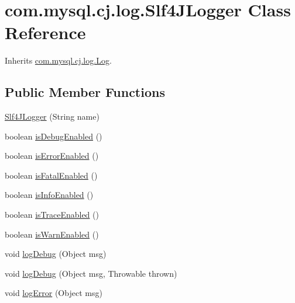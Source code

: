 \hypertarget{classcom_1_1mysql_1_1cj_1_1log_1_1_slf4_j_logger}{}\section{com.\+mysql.\+cj.\+log.\+Slf4\+J\+Logger Class Reference}
\label{classcom_1_1mysql_1_1cj_1_1log_1_1_slf4_j_logger}


Inherits \mbox{\hyperlink{interfacecom_1_1mysql_1_1cj_1_1log_1_1_log}{com.\+mysql.\+cj.\+log.\+Log}}.

\subsection*{Public Member Functions}
\begin{DoxyCompactItemize}
\item 
\mbox{\hyperlink{classcom_1_1mysql_1_1cj_1_1log_1_1_slf4_j_logger_af5581eba75f230b5acbb76789e679593}{Slf4\+J\+Logger}} (String name)
\item 
boolean \mbox{\hyperlink{classcom_1_1mysql_1_1cj_1_1log_1_1_slf4_j_logger_a2063aafb5440a0a1a8b9038603916773}{is\+Debug\+Enabled}} ()
\item 
boolean \mbox{\hyperlink{classcom_1_1mysql_1_1cj_1_1log_1_1_slf4_j_logger_a3401a68eb92f0e0eec87e8140c36faa7}{is\+Error\+Enabled}} ()
\item 
boolean \mbox{\hyperlink{classcom_1_1mysql_1_1cj_1_1log_1_1_slf4_j_logger_ae5ee0af225f5bc993dc023b8b31de983}{is\+Fatal\+Enabled}} ()
\item 
boolean \mbox{\hyperlink{classcom_1_1mysql_1_1cj_1_1log_1_1_slf4_j_logger_ab21b243a10ab8a46a4706658298ecd5e}{is\+Info\+Enabled}} ()
\item 
boolean \mbox{\hyperlink{classcom_1_1mysql_1_1cj_1_1log_1_1_slf4_j_logger_afbf9106392050f7ca64b0ad7582b7517}{is\+Trace\+Enabled}} ()
\item 
boolean \mbox{\hyperlink{classcom_1_1mysql_1_1cj_1_1log_1_1_slf4_j_logger_aaf12f87af0d37c01118649ba65220a69}{is\+Warn\+Enabled}} ()
\item 
void \mbox{\hyperlink{classcom_1_1mysql_1_1cj_1_1log_1_1_slf4_j_logger_aef79b4ff2ba3058fe4f713db62707e6c}{log\+Debug}} (Object msg)
\item 
void \mbox{\hyperlink{classcom_1_1mysql_1_1cj_1_1log_1_1_slf4_j_logger_aeaf3ce8432b63f1b631e7ad698ea7aa6}{log\+Debug}} (Object msg, Throwable thrown)
\item 
void \mbox{\hyperlink{classcom_1_1mysql_1_1cj_1_1log_1_1_slf4_j_logger_a1a99e9a4f586e0678a68d1145cd26bc5}{log\+Error}} (Object msg)

\end{DoxyCompactItemize}
